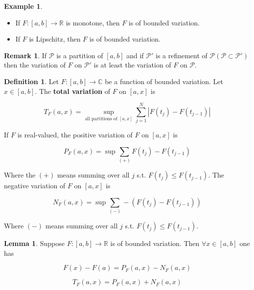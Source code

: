\documentclass{article}
\theoremstyle{definition}
\newtheorem{ex}{Example}
\newtheorem{lem}{Lemma}
\newtheorem{dfn}{Definition}
\newtheorem{rem}{Remark}
\begin{document}
\begin{ex}
  \begin{itemize}
    \item If $F: [a, b] \rightarrow \mathbb{R}$ is monotone, then $F$ is of bounded variation.

    \item If $F$ is Lipschitz, then $F$ is of bounded variation.
  \end{itemize}
\end{ex}

\begin{rem}
  If $\mathcal{P}$ is a partition of $[a, b]$ and if $\mathcal{P}'$ is a refinement of $\mathcal{P} (\mathcal{P} \subset \mathcal{P}')$ then the variation of $F$ on $\mathcal{P}'$ is at least the variation of $F$ on $\mathcal{P}$. 
\end{rem}

\begin{dfn}
  Let $F:[a, b] \rightarrow \mathbb{C}$ be a function of bounded variation. Let $x \in [a, b]$. The \textbf{total variation} of $F$ on $[a, x]$ is 

  $$T_F(a, x) = \sup_{\text{all partitions of } [a, x]} \sum_{j = 1}^N |F(t_j) - F(t_{j - 1})|$$

  If $F$ is real-valued, the positive variation of $F$ on $[a,x]$ is 

  $$P_F (a, x) = \sup \sum_{(+)} F(t_j) - F(t_{j - 1})$$

  Where the $(+)$ means summing over all $j$ s.t. $F(t_j) \leq F(t_{j - 1})$. The negative variation of $F$ on $[a, x]$ is

  $$N_F (a, x) = \sup \sum_{(-)} - (F(t_j) - F(t_{j - 1}))$$

  Where $(-)$ means summing over all $j$ s.t. $F(t_j) \leq F(t_{j - 1})$. 
\end{dfn}

\begin{lem}
  Suppose $F:[a, b] \rightarrow \mathbb{R}$ is of bounded variation. Then $\forall x \in [a, b]$ one has

  $$F(x) - F(a) = P_F (a, x) - N_F(a, x)$$

  $$T_F(a, x) = P_F(a, x) + N_F(a, x)$$
\end{lem}
\end{document}
